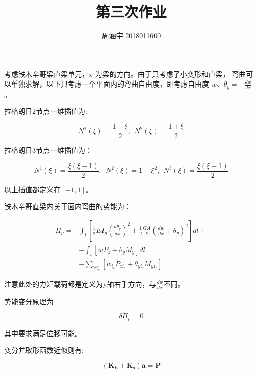\documentclass[UTF8,c5size]{ctexart}
\title{{\bfseries 第三次作业}}
\author{周涵宇 2018011600}
\date{}
\begin{document}
\maketitle

考虑铁木辛哥梁直梁单元，$x$ 为梁的方向。由于只考虑了小变形和直梁，
弯曲可以单独求解，以下只考虑一个平面内的弯曲自由度，即考虑自由度
$w$、$\theta_y=-\frac{dw}{dx}$。


拉格朗日2节点一维插值为:

\begin{equation}
    N^1(\xi) = \frac{1-\xi}{2},\ \ N^2(\xi) = \frac{1+\xi}{2}
\end{equation}

拉格朗日3节点一维插值为：

\begin{equation}
    N^1(\xi) = \frac{\xi(\xi-1)}{2},\ \ 
    N^2(\xi) = 1-\xi^2,\ \ 
    N^3(\xi) = \frac{\xi(\xi+1)}{2}
\end{equation}


以上插值都定义在$[-1,1]$。

铁木辛哥直梁内关于面内弯曲的势能为：

\begin{equation}
    \begin{split}
        \Pi_p=
            &\int_{l}{\left[
            \frac{1}{2}EI_y\left(\frac{d\theta_y}{dx}\right)^2+  
            \frac{1}{2}\frac{GA}{k}\left(\frac{dw}{dx}+\theta_y\right)^2
            \right]dl}+\\
            &-\int_{l}{\left[
                wP_z+\theta_yM_y
                \right]dl}\\
            &-\sum_{\forall i_c}{\left[
            w_{i_c}P_{zi_c}
            +\theta_{yi_c}M_{yi_c}
            \right]}
    \end{split}
\end{equation}

注意此处的力矩载荷都是定义为y轴右手方向，与$\frac{dw}{dx}$不同。

势能变分原理为

$$
\delta\Pi_p=0
$$

其中要求满足位移可能。

变分并取形函数近似则有:

\begin{equation}
    (\bm{K_b}+\bm{K_s})\bm{a}=\bm{P}    
\end{equation}
\end{document}
